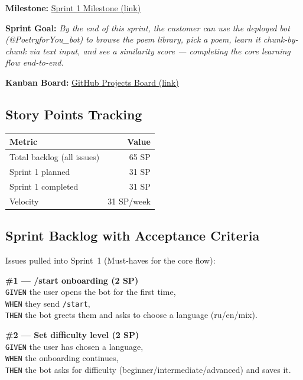 \documentclass[11pt, a4paper]{article}
\begin{document}
\textbf{Milestone:} \href{https://github.com/d13-l1t3/PoetryForYou/milestone/1}{Sprint 1 Milestone (link)}

\textbf{Sprint Goal:} \textit{By the end of this sprint, the customer can use the deployed bot (@PoetryforYou\_bot) to browse the poem library, pick a poem, learn it chunk-by-chunk via text input, and see a similarity score --- completing the core learning flow end-to-end.}

\textbf{Kanban Board:} \href{https://github.com/d13-l1t3/PoetryForYou/projects/1}{GitHub Projects Board (link)}

\subsection*{Story Points Tracking}

\begin{center}
\begin{tabular}{|l|r|}
\hline
\textbf{Metric} & \textbf{Value} \\
\hline
Total backlog (all issues) & 65 SP \\
\hline
Sprint 1 planned & 31 SP \\
\hline
Sprint 1 completed & 31 SP \\
\hline
Velocity & 31 SP/week \\
\hline
\end{tabular}
\end{center}

\subsection*{Sprint Backlog with Acceptance Criteria}

Issues pulled into Sprint~1 (Must-haves for the core flow):

\textbf{\#1 --- /start onboarding (2 SP)}\\
\texttt{GIVEN} the user opens the bot for the first time,\\
\texttt{WHEN} they send \texttt{/start},\\
\texttt{THEN} the bot greets them and asks to choose a language (ru/en/mix).

\textbf{\#2 --- Set difficulty level (2 SP)}\\
\texttt{GIVEN} the user has chosen a language,\\
\texttt{WHEN} the onboarding continues,\\
\texttt{THEN} the bot asks for difficulty (beginner/intermediate/advanced) and saves it.
\end{document}
